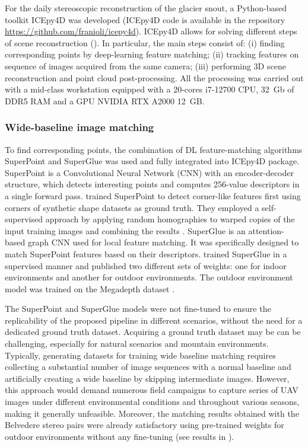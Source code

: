 For the daily stereoscopic reconstruction of the glacier snout, a Python-based toolkit
ICEpy4D was developed (ICEpy4D code is available in the repository
\url{https://github.com/franioli/icepy4d}).
ICEpy4D allows for solving different steps of scene reconstruction
(). In particular, the main steps consist of:
(i) finding corresponding points by deep-learning feature matching;
(ii) tracking features on sequence of images acquired from the same camera;
(iii) performing 3D scene reconstruction and point cloud post-processing.
All the processing was carried out with a mid-class workstation equipped with a 20-cores
i7-12700 CPU, 32~Gb of DDR5 RAM and a GPU NVIDIA RTX A2000 12~GB.

\subsubsection{Wide-baseline image matching}\label{sec:4:matching}

To find corresponding points, the combination of DL feature-matching algorithms
SuperPoint \citep{DeTone_2018} and SuperGlue \citep{sarlin2020superglue} was used and
fully integrated into ICEpy4D package.
SuperPoint is a Convolutional Neural Network (CNN) with an encoder-decoder
structure, which detects interesting points and computes 256-value descriptors in a
single forward pass.
\cite{DeTone_2018} trained SuperPoint to detect corner-like features first using corners
of synthetic shape datasets as ground truth.
They employed a self-supervised approach by applying random homographies to warped
copies of the input training images and combining the results \citep{DeTone_2018}.
SuperGlue is an attention-based graph CNN used for local feature matching.
It was specifically designed to match SuperPoint features based on their descriptors.
\cite{sarlin2020superglue} trained SuperGlue in a supervised manner and published two
different sets of weights: one for indoor environments and another for outdoor
environments.
The outdoor environment model was trained on the Megadepth dataset
\citep{Li_Snavely_2018_MegaDepth}.

The SuperPoint and SuperGlue models were not fine-tuned to ensure the replicability of
the proposed pipeline in different scenarios, without the need for a
dedicated ground truth dataset.
Acquiring a ground truth dataset may be can be challenging, especially for natural
scenarios and mountain environments.
Typically, generating datasets for training wide baseline matching requires collecting a
substantial number of image sequences with a normal baseline and artificially creating a
wide baseline by skipping intermediate images.
However, this approach would demand numerous field campaigns to capture series of UAV
images under different environmental conditions and throughout various seasons, making it
generally unfeasible.
Moreover, the matching results obtained with the Belvedere stereo pairs were already
satisfactory using pre-trained weights for outdoor environments without any fine-tuning
(see results in ).

